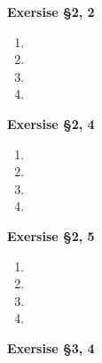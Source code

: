 \documentclass[12pt]{article}
\newenvironment{ques}[1]{\textbf{Exersise #1}\vspace{1 mm}\\ }{\bigskip}
\theoremstyle{definition}
\begin{document}
\begin{ques}{\S 2, 2}
	\begin{enumerate}
		\item

		\item

		\item

		\item

	\end{enumerate}
\end{ques}

\begin{ques}{\S 2, 4}
	\begin{enumerate}
		\item

		\item

		\item

		\item

	\end{enumerate}
\end{ques}

\begin{ques}{\S 2, 5}
	\begin{enumerate}
		\item

		\item

		\item

		\item

	\end{enumerate}
\end{ques}

\begin{ques}{\S 3, 4}
\end{ques}
\end{document}
